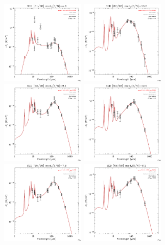 \documentclass[preprint2,longabstract]{aastex}
\begin{document}
\begin{figure}
\centering
    \includegraphics[trim=0 2mm 0 0, clip, width=40mm]{../SEDs/sed_61.pdf}
	\includegraphics[trim=0 2mm 0 0, clip, width=40mm]{../SEDs/sed_62.pdf}
	\includegraphics[trim=0 2mm 0 0, clip, width=40mm]{../SEDs/sed_63.pdf}
	\includegraphics[trim=0 2mm 0 0, clip, width=40mm]{../SEDs/sed_64.pdf}
	\includegraphics[trim=0 2mm 0 0, clip, width=40mm]{../SEDs/sed_65.pdf}
	\includegraphics[trim=0 2mm 0 0, clip, width=40mm]{../SEDs/sed_66.pdf}

\end{figure}
\end{document}
